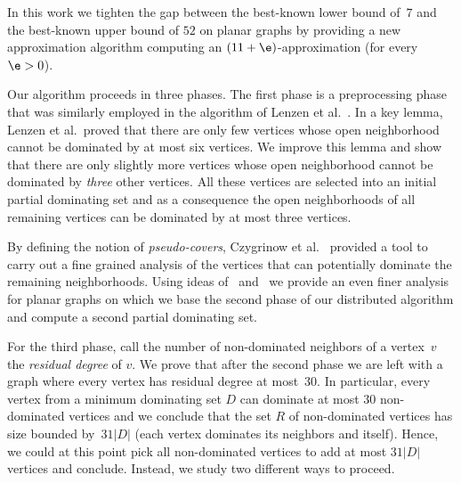 In this work we tighten the gap between the best-known
lower bound of~$7$ and the best-known upper bound of $52$ on planar graphs
by providing a new approximation algorithm computing an $(11+\e)$\hspace{1pt}-\hspace{1pt}approximation (for every $\e>0$).

Our algorithm proceeds in three phases.
The first phase is a preprocessing phase that was similarly employed in the
algorithm of Lenzen et al.~\cite{lenzen2013distributed}. In a key lemma,
Lenzen et al.\ proved that there are only few vertices whose open neighborhood
cannot be dominated by at most six vertices.
We improve this lemma and show
that there are only slightly more vertices whose open neighborhood cannot be
dominated by \emph{three} other vertices. All these vertices are selected into an
initial partial dominating set and as a consequence the open neighborhoods of all
remaining vertices can be dominated by at most three vertices.



By defining the notion of \emph{pseudo-covers},
Czygrinow et  al.~\cite{czygrinow2018distributed} provided a tool to carry
out a fine grained analysis of the vertices that can potentially dominate
the remaining neighborhoods.
Using ideas of~\cite{kublenz2020distributed} and~\cite{siebertz2019greedy}
we provide an even finer analysis for planar graphs on which we
base the second phase of our distributed algorithm and compute a
second partial dominating set.


For the third phase, call the number of non-dominated neighbors of a vertex~$v$
the \emph{residual degree} of $v$. We prove that
after the second phase we are left with a graph where every vertex
has residual degree at most~$30$. In particular, every vertex
from a minimum dominating set $D$ can dominate at most 30
non-dominated vertices and we conclude that the set $R$
of non-dominated vertices has size bounded by~$31|D|$ (each
vertex dominates its neighbors and itself). Hence, we could at this
point pick all non-dominated vertices to add at most $31|D|$ vertices
and conclude. Instead, we study two different ways to proceed.

